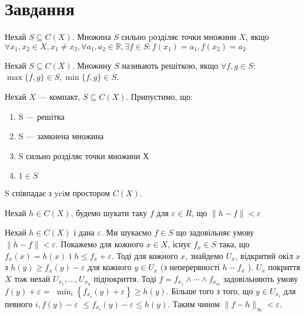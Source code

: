 
\chapter{Завдання \theHchapter}

\begin{tcolorbox}[title=Означення 1]
    Нехай $S \subseteq C(X)$. 
    Множина $S$ сильно pозділяє точки множини $X$, якщо
    $\forall x_1, x_2 \in X, x_1 \neq x_2, \forall a_1, a_2 \in \mathbb{R},
    \exists f \in S: f(x_1) = a_1, f(x_2) = a_2$
\end{tcolorbox}

\begin{tcolorbox}[title=Означення 2]
    Нехай $S \subseteq C(X)$. Множину $S$ називають решіткою, 
    якщо $\forall f, g \in S$:
    $\max\{f,g\} \in S, \min\{f,g\} \in S$.
\end{tcolorbox}


\begin{tcolorbox}[title=теорема Какутанi–Крейна.]
    Нехай $X$ — компакт, $S \subseteq C(X)$. Припустимо, що:

    \begin{enumerate}[1)]
        \item S — решітка
        \item S — замкнена множина 
        \item S сильно розділяє точки множини Х
        \item $1 \in S$
    \end{enumerate}

    
    S співпадає з yciм простором $C(X)$.
\end{tcolorbox}



Нехай $h \in C(X)$, будемо шукати таку $f$ для $\varepsilon \in R$, що 
$\|h - f\| < \varepsilon $


\pagebreak

Нехай $h \in C(X)$ і дана $\varepsilon$. 
Ми шукаємо $f \in S$ що задовільняє умову 
$\|h-f\|<\varepsilon$.
Покажемо для кожного $x \in X$, існує 
$f_x \in S$ така, що $f_x(x)=h(x)$ і $h \leq f_x+\varepsilon$.
Тоді для кожного $x$, знайдемо $U_x$, відкритий окіл $x$ з 
$h(y) \geq f_x(y)-\varepsilon$ для кожного $y \in U_x$ 
(з неперервності $h-f_x$ ). 
$U_x$ покриття $X$ тож нехай $U_{x_1}, \ldots, U_{x_n}$ підпокриття. 
Тоді $f=f_{x_1} \wedge \cdots \wedge f_{x_m}$ задовільняють умову 
$f(y)+\varepsilon=$ $\min _i\left\{f_{x_i}(y)+\varepsilon\right\} 
\geq h(y)$. 
Більше того з того, що $y \in U_{x_i}$ для певного $i, 
f(y)-\varepsilon$ $\leq f_{x_i}(y)-\varepsilon \leq h(y)$. 
Таким чином $\|f-h\|_{\infty}<\varepsilon$.

